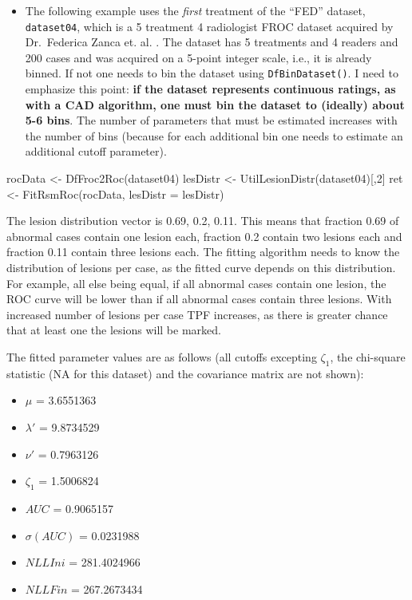 \documentclass[
]{book}
\newenvironment{Shaded}{\begin{snugshade}}{\end{snugshade}}
\newcommand{\AttributeTok}[1]{\textcolor[rgb]{0.77,0.63,0.00}{#1}}
\newcommand{\DecValTok}[1]{\textcolor[rgb]{0.00,0.00,0.81}{#1}}
\newcommand{\FunctionTok}[1]{\textcolor[rgb]{0.00,0.00,0.00}{#1}}
\newcommand{\NormalTok}[1]{#1}
\newcommand{\OtherTok}[1]{\textcolor[rgb]{0.56,0.35,0.01}{#1}}
\providecommand{\tightlist}{%
  \setlength{\itemsep}{0pt}\setlength{\parskip}{0pt}}
\begin{document}
\begin{itemize}
\tightlist
\item
  The following example uses the \emph{first} treatment of the ``FED'' dataset, \texttt{dataset04}, which is a 5 treatment 4 radiologist FROC dataset acquired by Dr.~Federica Zanca et. al. \citep{RN1882}. The dataset has 5 treatments and 4 readers and 200 cases and was acquired on a 5-point integer scale, i.e., it is already binned. If not one needs to bin the dataset using \texttt{DfBinDataset()}. I need to emphasize this point: \textbf{if the dataset represents continuous ratings, as with a CAD algorithm, one must bin the dataset to (ideally) about 5-6 bins}. The number of parameters that must be estimated increases with the number of bins (because for each additional bin one needs to estimate an additional cutoff parameter).
\end{itemize}

\begin{Shaded}
\begin{Highlighting}[]
\NormalTok{rocData }\OtherTok{\textless{}{-}} \FunctionTok{DfFroc2Roc}\NormalTok{(dataset04)}
\NormalTok{lesDistr }\OtherTok{\textless{}{-}} \FunctionTok{UtilLesionDistr}\NormalTok{(dataset04)[,}\DecValTok{2}\NormalTok{]}
\NormalTok{ret }\OtherTok{\textless{}{-}} \FunctionTok{FitRsmRoc}\NormalTok{(rocData, }\AttributeTok{lesDistr =}\NormalTok{ lesDistr)}
\end{Highlighting}
\end{Shaded}

The lesion distribution vector is 0.69, 0.2, 0.11. This means that fraction 0.69 of abnormal cases contain one lesion each, fraction 0.2 contain two lesions each and fraction 0.11 contain three lesions each. The fitting algorithm needs to know the distribution of lesions per case, as the fitted curve depends on this distribution. For example, all else being equal, if all abnormal cases contain one lesion, the ROC curve will be lower than if all abnormal cases contain three lesions. With increased number of lesions per case TPF increases, as there is greater chance that at least one the lesions will be marked.

The fitted parameter values are as follows (all cutoffs excepting \(\zeta_1\), the chi-square statistic (NA for this dataset) and the covariance matrix are not shown):

\begin{itemize}
\tightlist
\item
  \(\mu\) = 3.6551363
\item
  \(\lambda'\) = 9.8734529
\item
  \(\nu'\) = 0.7963126
\item
  \(\zeta_1\) = 1.5006824
\item
  \(AUC\) = 0.9065157
\item
  \(\sigma (AUC)\) = 0.0231988
\item
  \(NLLIni\) = 281.4024966
\item
  \(NLLFin\) = 267.2673434
\end{itemize}
\end{document}
